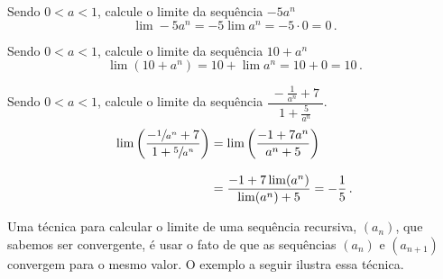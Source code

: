 \begin{example}
  Sendo $0<a<1$, calcule o limite da sequência \(-5a^n\)
  \solution
  \[
    \lim -5a^n = -5\lim a^n= -5 \cdot 0 = 0  \,.
  \]
\end{example}

\begin{example}
  Sendo $0<a<1$, calcule o limite da sequência \(10+a^n\)
  \solution
  \[
    \lim (10+a^n) = 10+\lim a^n = 10+0 = 10  \,.
  \]
\end{example}

\begin{example}
    Sendo $0<a<1$, calcule o limite da sequência
    \(
      \dfrac{\;-\frac{1}{a^n}+7\;}{ 1 + \frac{5}{a^n}}
    \).
    \solution
    \vspace{-0.5\baselineskip}
    \begin{align*}
      \lim \left(\frac{-\sfrac{1}{a^n}+7}{1+ \sfrac{5}{a^n}}\right)
          & = \lim \left(\frac{-1+7a^n}{a^n+5}\right) \\[3mm]
          & = \dfrac{-1+7\lim(a^n)}{\lim(a^n) + 5}
            =-\frac{1}{5}  \,.
    \end{align*}
\end{example}

Uma técnica para calcular o limite de uma sequência
recursiva, $(a_n)$, que sabemos ser convergente, é
usar o fato de que as sequências $(a_n)$ e $(a_{n+1})$ convergem para o mesmo
valor. O exemplo a seguir ilustra essa técnica.


